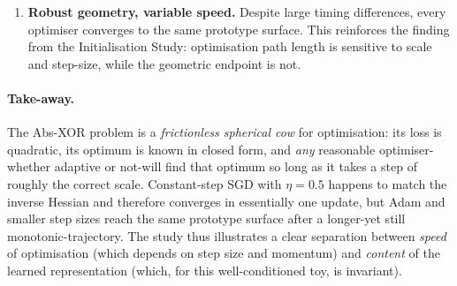 \begin{enumerate}[label=\arabic*.]
    \item \textbf{Robust geometry, variable speed.}  
          Despite large timing differences, every optimiser converges to
          the same prototype surface.  This reinforces the finding from
          the Initialisation Study: optimisation path length is sensitive to
          scale and step-size, while the geometric endpoint is not.

        \end{enumerate}

\paragraph{Take-away.}
The Abs-XOR problem is a \textit{frictionless spherical cow} for optimisation:
its loss is quadratic, its optimum is known in closed form, and \emph{any}
reasonable optimiser-whether adaptive or not-will find that optimum so long
as it takes a step of roughly the correct scale.  Constant-step SGD with
\(\eta = 0.5\) happens to match the inverse Hessian and therefore converges
in essentially one update, but Adam and smaller step sizes reach the same
prototype surface after a longer-yet still monotonic-trajectory.  The study
thus illustrates a clear separation between \emph{speed} of optimisation
(which depends on step size and momentum) and \emph{content} of the learned
representation (which, for this well-conditioned toy, is invariant).
